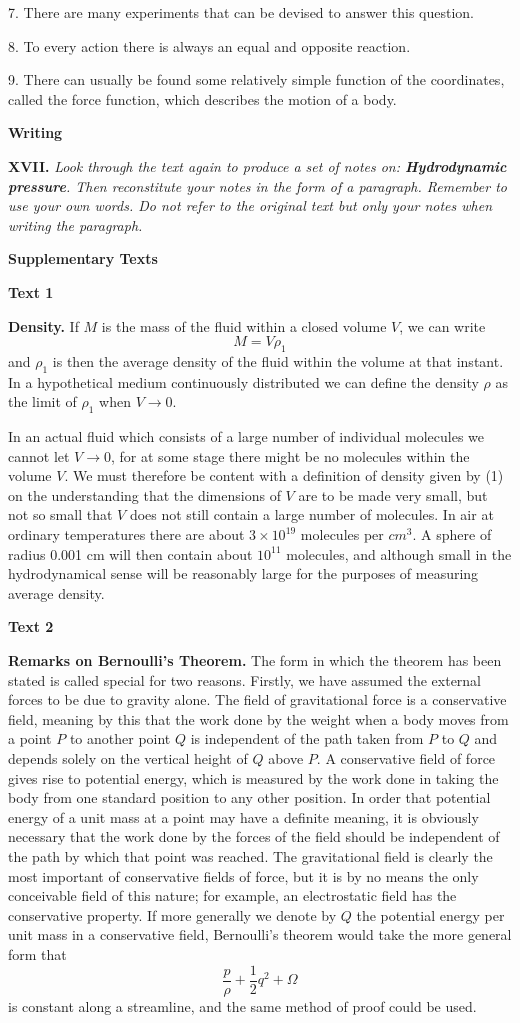 \documentclass[a4paper]{article}
\newcommand{\ESect}[1]{\medskip\par{\large \textbf{#1}}\par}
\newcommand{\ETask}[2]{\medskip\par\textbf{#1.} \textit{#2}\par}
\newcommand{\Eqn}[1]{\begin{equation}#1\end{equation}}
\begin{document}
7. There are many experiments that can be devised to answer this question.

8. To every action there is always an equal and opposite reaction.

9. There can usually be found some relatively simple function of the coordinates, called the force function, which describes
the motion of a body.

\ESect{Writing}
\ETask{XVII}{Look through the text again to produce a set of notes on: \textbf{Hydrodynamic pressure}. Then reconstitute your notes
in the form of a paragraph. Remember to use your own words. Do not refer to the original text but only your notes when writing
the paragraph.}

\setcounter{equation}{0}
\ESect{Supplementary Texts}
\ESect{Text 1}
\textbf{Density.} If $M$ is the mass of the fluid within a closed volume $V$, we can write
\Eqn{M=V \rho_1}
and $\rho_1$ is then the average density of the fluid within the volume at that instant. In a hypothetical medium continuously
distributed we can define the density $\rho$ as the limit of $\rho_1$ when $V \rightarrow 0$.

In an actual fluid which consists of a large number of individual molecules we cannot let $V \rightarrow 0$, for at some stage
there might be no molecules within the volume $V$. We must therefore be content with a definition of density given by (1) on
the understanding that the dimensions of $V$ are to be made very small, but not so small that $V$ does not still contain a
large number of molecules. In air at ordinary temperatures there are about $3 \times 10^{19}$ molecules per $cm^3$. A sphere
of radius 0.001 cm will then contain about $10^{11}$ molecules, and although small in the hydrodynamical sense will be
reasonably large for the purposes of measuring average density.

\ESect{Text 2}
\textbf{Remarks on Bernoulli's Theorem.} The form in which the theorem has been stated is called special for two reasons.
Firstly, we have assumed the external forces to be due to gravity alone. The field of gravitational force is a conservative
field, meaning by this that the work done by the weight when a body moves from a point $P$ to another point $Q$ is independent
of the path taken from $P$ to $Q$ and depends solely on the vertical height of $Q$ above $P$. A conservative field of force
gives rise to potential energy, which is measured by the work done in taking the body from one standard position to any
other position. In order that potential energy of a unit mass at a point may have a definite meaning, it is obviously
necessary that the work done by the forces of the field should be independent of the path by which that point was reached.
The gravitational field is clearly the most important of conservative fields of force, but it is by no means the only
conceivable field of this nature; for example, an electrostatic field has the conservative property. If more generally we
denote by $Q$ the potential energy per unit mass in a conservative field, Bernoulli's theorem would take the more general form that
$$\frac{p}{\rho}+\frac{1}{2}q^2+\Omega$$
is constant along a streamline, and the same method of proof could be used.
\end{document}
